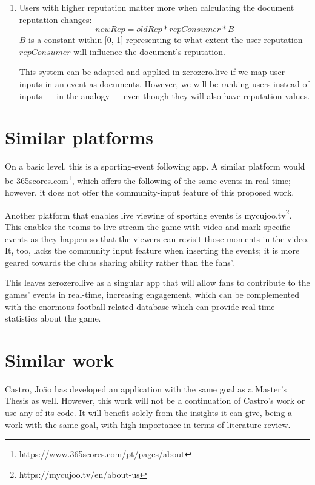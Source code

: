 \begin{enumerate}
    \item Users with higher reputation matter more when calculating the document reputation changes:
    \begin{equation}
        newRep = oldRep * repConsumer * B
    \end{equation}
    $B$ is a constant within [0, 1] representing to what extent the user reputation $repConsumer$ will influence the document's reputation.

    This system can be adapted and applied in zerozero.live if we map user inputs in an event as documents. However, we will be ranking users instead of inputs ---  in the analogy --- even though they will also have reputation values.
    
\end{enumerate} 

\section{Similar platforms}

On a basic level, this is a sporting-event following app. A similar platform would be 365scores.com\footnote{https://www.365scores.com/pt/pages/about}, which offers the following of the same events in real-time; however, it does not offer the community-input feature of this proposed work.

Another platform that enables live viewing of sporting events is mycujoo.tv\footnote{https://mycujoo.tv/en/about-us}. This enables the teams to live stream the game with video and mark specific events as they happen so that the viewers can revisit those moments in the video. It, too, lacks the community input feature when inserting the events; it is more geared towards the clubs sharing ability rather than the fans'. 

This leaves zerozero.live as a singular app that will allow fans to contribute to the games' events in real-time, increasing engagement, which can be complemented with the enormous football-related database which can provide real-time statistics about the game.

\section{Similar work}

Castro, João \cite{PedroSousaCastro2020} has developed an application with the same goal as a Master's Thesis as well. However, this work will not be a continuation of Castro's work or use any of its code. It will benefit solely from the insights it can give, being a work with the same goal, with high importance in terms of literature review.

